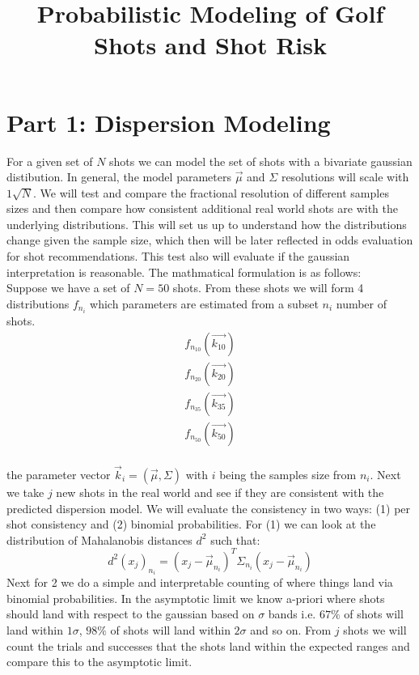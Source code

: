 \documentclass{article}
\title{Probabilistic Modeling of Golf Shots and Shot Risk}
\begin{document}
\maketitle


\section{Part 1: Dispersion Modeling}
For a given set of $N$ shots we can model the set of shots with a bivariate gaussian distibution. In general, the model parameters $\vec{\mu}$ and $\Sigma$ resolutions will scale with $1\sqrt{N}$. We will test and compare the fractional resolution of different samples sizes and then compare how consistent additional real world shots are with the underlying distributions. This will set us up to understand how the distributions change given the sample size, which then will be later reflected in odds evaluation for shot recommendations. This test also will evaluate if the gaussian interpretation is reasonable. The mathmatical formulation is as follows:\\


Suppose we have a set of $N=50$ shots. From these shots we will form 4 distributions $f_{n_i}$ which parameters are estimated from a subset $n_i$ number of shots.
\begin{equation}
\begin{split}
f_{n_{10}}( \vec{k_{10}} ) \\
f_{n_{20}}( \vec{k_{20}} ) \\
f_{n_{35}}( \vec{k_{35}} ) \\
f_{n_{50}}( \vec{k_{50}} ) \\
\end{split}
\end{equation}

the parameter vector $\vec{k}_i = (\vec{\mu}, \Sigma)$ with $i$ being the samples size from $n_i$. Next we take $j$ new shots in the real world and see if they are consistent with the predicted dispersion model. We will evaluate the consistency in two ways: (1) per shot consistency and (2) binomial probabilities. For (1) we can look at the distribution of Mahalanobis distances $d^2$ such that:
\begin{equation}
d^2(x_j)_{n_i} = (x_j-\vec{\mu}_{n_i})^T \Sigma_{n_i} (x_j-\vec{\mu}_{n_i})
\end{equation}
Next for 2 we do a simple and interpretable counting of where things land via binomial probabilities. In the asymptotic limit we know a-priori where shots should land with respect to the gaussian based on $\sigma$ bands i.e. $67\%$ of shots will land within $1\sigma$, $98\%$ of shots will land within $2\sigma$ and so on. From $j$ shots we will count the trials and successes that the shots land within the expected ranges and compare this to the asymptotic limit.
\end{document}
